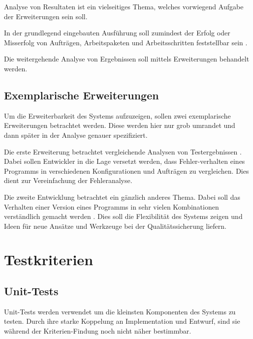Analyse von Resultaten ist ein vielseitiges Thema,
welches vorwiegend Aufgabe der Erweiterungen sein soll.

In der grundlegend eingebauten Ausf\"uhrung soll zumindest der Erfolg oder Misserfolg
von Auftr\"agen, Arbeitspaketen und Arbeitsschritten feststellbar sein .

Die weitergehende Analyse von Ergebnissen soll mittels Erweiterungen behandelt werden.

\subsection{Exemplarische Erweiterungen}

Um die Erweiterbarkeit des Systems aufzuzeigen,
sollen zwei exemplarische Erweiterungen betrachtet werden.
Diese werden hier nur grob umrandet und dann sp\"ater in der Analyse genauer spezifiziert.

Die erste Erweiterung betrachtet vergleichende Analysen von Testergebnissen .
Dabei sollen Entwickler in die Lage versetzt werden,
dass Fehler-verhalten eines Programms in verschiedenen Konfigurationen und Auftr\"agen zu vergleichen.
Dies dient zur Vereinfachung der Fehleranalyse.

Die zweite Entwicklung betrachtet ein gänzlich anderes Thema.
Dabei soll das Verhalten einer Version eines Programms
in sehr vielen Kombinationen verst\"andlich gemacht werden .
Dies soll die Flexibilit\"at des Systems zeigen und
Ideen f\"ur neue Ans\"atze und Werkzeuge bei der Qualit\"atssicherung liefern.





\section{Testkriterien}


\subsection{Unit-Tests}

Unit-Tests werden verwendet um die kleinsten Komponenten des Systems zu testen.
Durch ihre starke Koppelung an Implementation und Entwurf,
sind sie w\"ahrend der Kriterien-Findung noch nicht n\"aher bestimmbar.

